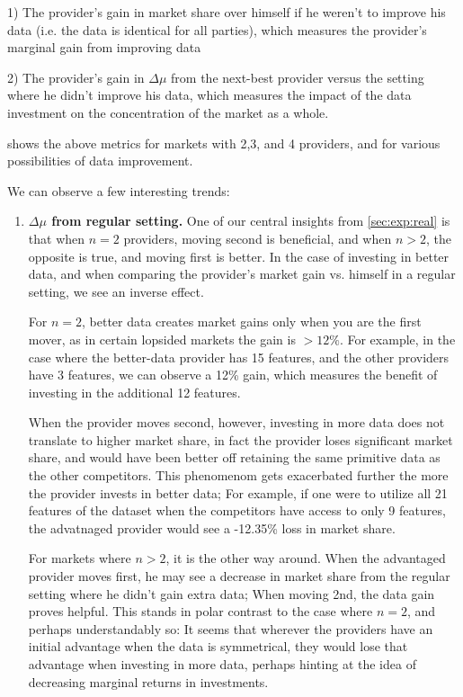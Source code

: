 1) The provider's gain in market share over himself if he weren't to improve his data (i.e. the data is identical for all parties), which measures the provider's marginal gain from improving  data

2) The provider's gain in $\Delta \mu$ from the next-best provider versus the setting where he didn't improve his data, which measures the impact of the data investment on the concentration of the market as a whole.

 shows the above metrics for markets with 2,3, and 4 providers, and for various possibilities of data improvement. 

We can observe a few interesting trends:
\begin{enumerate}
    \item \textbf{$\Delta\mu$ from regular setting.} One of our central insights from  \cref{sec:exp:real} is that when $n=2$ providers, moving second is beneficial, and when $n>2$, the opposite is true, and moving first is better. In the case of investing in better data, and when comparing the provider's market gain vs. himself in a regular setting, we see an inverse effect.
    
    For $n=2$, better data creates market gains only when you are the first mover, as in certain lopsided markets the gain is $>12\%$. For example, in the case where the better-data provider has 15 features, and the other providers have 3 features, we can observe a 12\% gain, which measures the benefit of investing in the additional 12 features.  

    When the provider moves second, however, investing in more data does not translate to higher market share, in fact the provider loses significant market share, and would have been better off retaining the same primitive data as the other competitors.
    This phenomenom gets exacerbated further the more the provider invests in better data; For example, if one were to utilize all 21 features of the dataset when the competitors have access to only 9 features, the advatnaged provider would see a -12.35\% loss in market share.

    For markets where $n>2$, it is the other way around. When the advantaged provider moves first, he may see a decrease in market share from the regular setting where he didn't gain extra data; When moving 2nd, the data gain proves helpful. This stands in polar contrast to the case where $n=2$, and perhaps understandably so: It seems that wherever the providers have an initial advantage when the data is symmetrical, they would lose that advantage when investing in more data, perhaps hinting at the idea of decreasing marginal returns in investments.


\end{enumerate}

